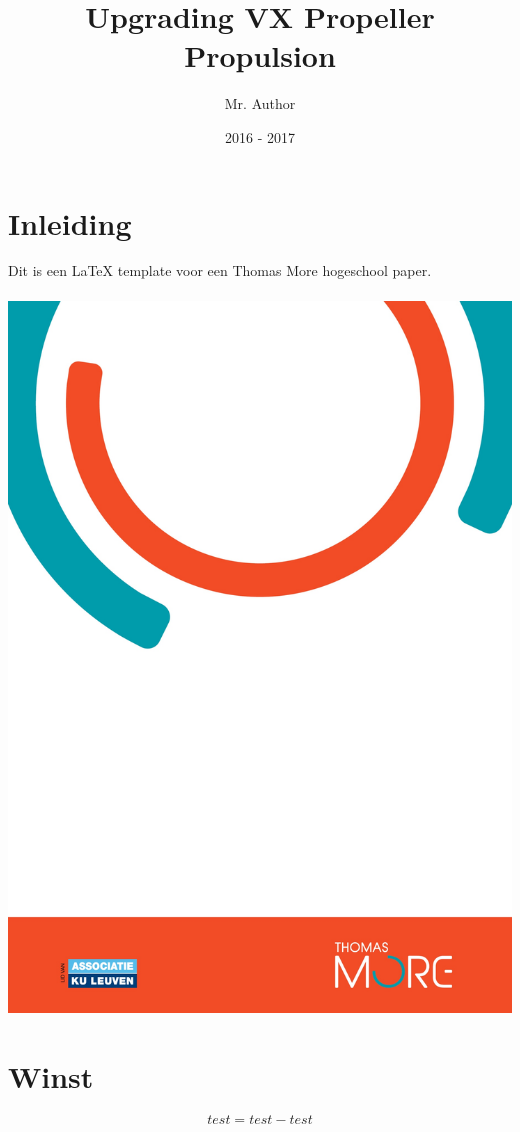 \documentclass[11pt, a4paper, oneside]{article}
\title{Upgrading VX Propeller Propulsion}
\author{Mr. Author}
\date{2016 - 2017}
\begin{document}

\tableofcontents

\newpage



\chapter{Inleiding}

Dit is een LaTeX template voor een Thomas More hogeschool paper.\\\\
 \includegraphics[scale=0.5]{images/ThomasMoreBackground.jpeg}

\newpage

\chapter{Winst}

	\begin{mdframed}[backgroundcolor=grijs!40,shadow=false,roundcorner=8pt]
		$$test = test - test$$
	\end{mdframed}


\end{document}
